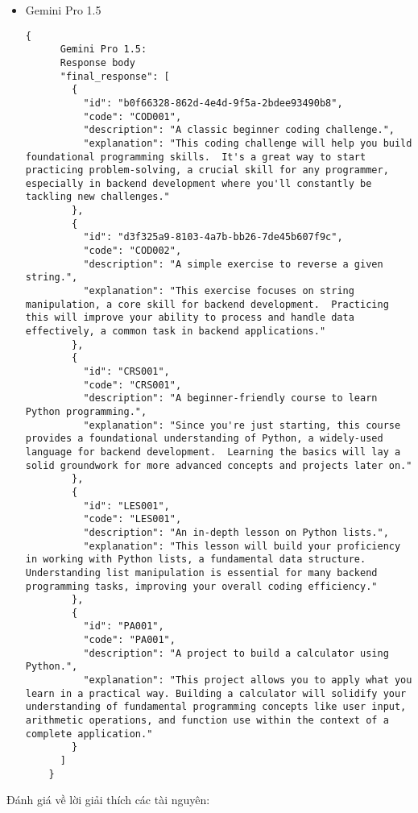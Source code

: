 \begin{itemize}
\begin{lstlisting}[breaklines=true]
        }
      ]
    }
    \end{lstlisting}
    \item Gemini Pro 1.5
    \begin{lstlisting}[breaklines=true]
    {
      Gemini Pro 1.5:
      Response body
      "final_response": [
        {
          "id": "b0f66328-862d-4e4d-9f5a-2bdee93490b8",
          "code": "COD001",
          "description": "A classic beginner coding challenge.",
          "explanation": "This coding challenge will help you build foundational programming skills.  It's a great way to start practicing problem-solving, a crucial skill for any programmer, especially in backend development where you'll constantly be tackling new challenges."
        },
        {
          "id": "d3f325a9-8103-4a7b-bb26-7de45b607f9c",
          "code": "COD002",
          "description": "A simple exercise to reverse a given string.",
          "explanation": "This exercise focuses on string manipulation, a core skill for backend development.  Practicing this will improve your ability to process and handle data effectively, a common task in backend applications."
        },
        {
          "id": "CRS001",
          "code": "CRS001",
          "description": "A beginner-friendly course to learn Python programming.",
          "explanation": "Since you're just starting, this course provides a foundational understanding of Python, a widely-used language for backend development.  Learning the basics will lay a solid groundwork for more advanced concepts and projects later on."
        },
        {
          "id": "LES001",
          "code": "LES001",
          "description": "An in-depth lesson on Python lists.",
          "explanation": "This lesson will build your proficiency in working with Python lists, a fundamental data structure.  Understanding list manipulation is essential for many backend programming tasks, improving your overall coding efficiency."
        },
        {
          "id": "PA001",
          "code": "PA001",
          "description": "A project to build a calculator using Python.",
          "explanation": "This project allows you to apply what you learn in a practical way. Building a calculator will solidify your understanding of fundamental programming concepts like user input, arithmetic operations, and function use within the context of a complete application."
        }
      ]
    }
    \end{lstlisting}
\end{itemize}
Đánh giá về lời giải thích các tài nguyên:
